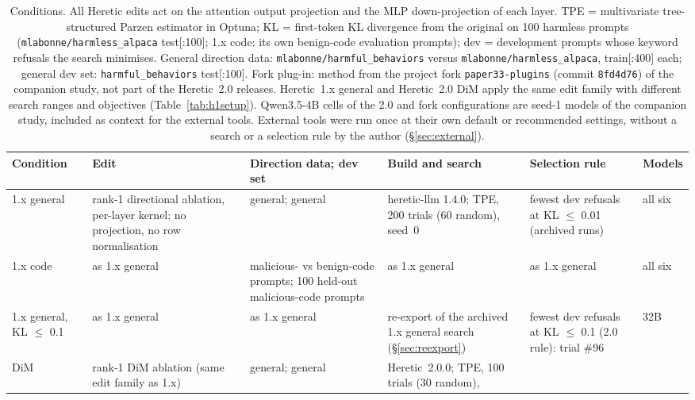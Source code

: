 \begin{table}[tbp]
\centering\small
\caption{Conditions. All Heretic edits act on the attention output projection and the MLP down-projection of each
layer. TPE = multivariate tree-structured Parzen estimator in Optuna; KL = first-token KL divergence from the
original on 100 harmless prompts (\texttt{mlabonne/harmless\_alpaca} test[:100]; 1.x code: its own benign-code
evaluation prompts); dev = development prompts whose
keyword refusals the search minimises. General direction data: \texttt{mlabonne/harmful\_behaviors} versus
\texttt{mlabonne/harmless\_alpaca}, train[:400] each; general dev set: \texttt{harmful\_behaviors} test[:100].
Fork plug-in: method from the project fork \texttt{paper33-plugins} (commit \texttt{8fd4d76}) of the companion
study, not part of the Heretic~2.0 releases. Heretic~1.x general and Heretic~2.0 DiM apply the same edit family
with different search ranges and objectives (Table~\ref{tab:h1setup}). Qwen3.5-4B cells of the 2.0 and fork configurations are seed-1 models of the companion
study, included as context for the external tools. External tools were run once at their own default or recommended
settings, without a search or a selection rule by the author (\S\ref{sec:external}).}
\label{tab:conditions}
\setlength{\tabcolsep}{4pt}
\begin{tabular}{@{}>{\raggedright\arraybackslash}p{2.25cm}>{\raggedright\arraybackslash}p{2.9cm}%
>{\raggedright\arraybackslash}p{2.75cm}>{\raggedright\arraybackslash}p{2.7cm}%
>{\raggedright\arraybackslash}p{2.55cm}>{\raggedright\arraybackslash}p{1.45cm}@{}}
\toprule
Condition & Edit & Direction data; dev set & Build and search & Selection rule & Models \\
\midrule
1.x general & rank-1 directional ablation, per-layer kernel; no projection, no row normalisation & general;
general & heretic-llm 1.4.0; TPE, 200 trials (60 random), seed~0 & fewest dev refusals at KL $\le$ 0.01 (archived
runs) & all six \\
1.x code & as 1.x general & malicious- vs benign-code prompts; 100 held-out malicious-code prompts & as 1.x general &
as 1.x general & all six \\
1.x general, KL $\le$ 0.1 & as 1.x general & as 1.x general & re-export of the archived 1.x general search
(\S\ref{sec:reexport}) & fewest dev refusals at KL $\le$ 0.1 (2.0 rule): trial \#96 & 32B \\
\midrule
2.0 DiM & rank-1 DiM ablation (same edit family as 1.x) & general; general & Heretic~2.0.0; TPE, 100 trials (30 random),

\end{tabular}
\end{table}
